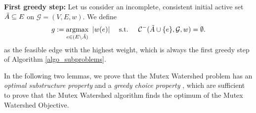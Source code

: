 \begin{definition}
\textbf{First greedy step:}\label{def:greedy_step}
Let us consider an incomplete, consistent initial active set $\tilde{A} \subseteq E$ on $\mathcal{G} = (V, E, w)$. We define 
\begin{equation}\label{eq:greedy_step}
       g := \underset{e \in (E \setminus \tilde{A})}{\text{argmax}} \;  \; |w(e)| \quad \textrm{ s.t. } \quad \mathcal{C}^{-}(\tilde{A} \cup \{e\}, \mathcal{G}, w)  =  \emptyset. 
\end{equation}
as the feasible edge with the highest weight, which is always the first greedy step of Algorithm \ref{algo_subproblems}.
\end{definition}
\noindent In the following two lemmas, %
 we prove that the Mutex Watershed problem has an \emph{optimal substructure property} and a \emph{greedy choice property} \cite{cormen2009introduction},
which are sufficient to prove that the Mutex Watershed algorithm finds the optimum of the Mutex Watershed Objective.




